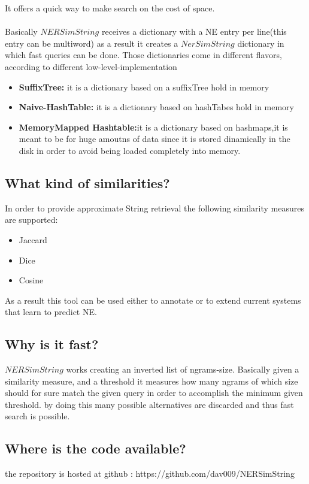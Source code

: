 It offers a quick way to make search on the cost of space.\\
\\
Basically $NERSimString$ receives a dictionary with a NE entry per line(this entry can be multiword)
as a result it creates a $NerSimString$ dictionary in which fast queries can be done.
Those dictionaries come in different flavors, according to different low-level-implementation
\begin{itemize}
 	\item \textbf{SuffixTree:}  it is a dictionary based on a suffixTree hold in memory
 	\item \textbf{Naive-HashTable:}  it is a dictionary based on hashTabes hold in memory
 	\item \textbf{MemoryMapped Hashtable:}it is a dictionary based on hashmaps,it is meant to be for huge amoutns of data since it is stored dinamically in the disk in order to avoid being loaded completely into memory.
\end{itemize}

\subsection*{What kind of similarities?}
In order to provide approximate String retrieval the following similarity measures are supported:
\begin{itemize}
	\item Jaccard
	\item Dice
	\item Cosine
\end{itemize}

As a result this tool can be used either to annotate or to extend current systems that learn to predict NE.

\subsection*{Why is it fast?}
$NERSimString$ works creating an inverted list of ngrams-size.
Basically given a similarity measure, and a threshold it measures how many ngrams of which size should for sure match the given query in order
to accomplish the minimum given threshold. by doing this many possible alternatives are discarded and thus fast search is possible.

\subsection*{Where is the code available?}
the repository is hosted at github : https://github.com/dav009/NERSimString









